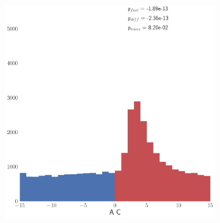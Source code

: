 \documentclass[11pt]{article}
\begin{document}
\begin{figure}
\begin{subfigure}{0.485\textwidth} \includegraphics[scale=.25]{xcorr_highres_AC}
\caption{} \label{fig:cchvswald:2}
\end{subfigure}


\end{figure}
\end{document}
